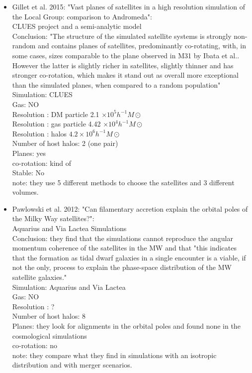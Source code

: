 \documentclass{emulateapj}
\begin{document}
\begin{itemize}
\item{ Gillet et al. 2015: "Vast planes of satellites in a high resolution simulation of
the Local Group: comparison to Andromeda":\\
CLUES project and a semi-analytic model\\
Conclusion: "The structure of the simulated satellite systems is
strongly non-random and contains planes of satellites, predominantly
co-rotating, with, in some cases, sizes comparable to the plane
observed in M31 by Ibata et al.. However the latter is slightly richer
in satellites, slightly thinner and has stronger co-rotation, which
makes it stand out as overall more exceptional than the simulated
planes, when compared to a random population" \\
Simulation: CLUES\\
Gas: NO\\
Resolution : DM particle 2.1 $\times 10^5 h^{-1} M\odot$\\
Resolution : gas particle 4.42 $\times 10^4 h^{-1} M\odot$\\
Resolution : halos $4.2\times 10^6 h^{-1} M\odot$\\
Number of host halos: 2 (one pair)\\
Planes: yes\\
co-rotation: kind of\\
Stable: No\\
note: they use 5 different methods to choose the satellites and 3
different volumes.\\
}

\item{ Pawlowski et al. 2012: "Can filamentary accretion explain the
orbital poles of the Milky Way satellites?":\\
Aquarius and Via Lactea Simulations\\
Conclusion: they find that the simulations cannot reproduce the
angular momentum coherence of the satellites in the MW and that "this
indicates that the formation as tidal dwarf galaxies in a single
encounter is a viable, if not the only, process to explain the
phase-space distribution of the MW satellite galaxies." \\
Simulation: Aquarius and Via Lactea\\
Gas: NO\\
Resolution : ?\\
Number of host halos: 8\\
Planes: they look for alignments in the orbital poles and found none
in the cosmological simulations\\
co-rotation: no\\
note: they compare what they find in simulations with an isotropic
distribution and with merger scenarios.\\
}


\end{itemize}
\end{document}
